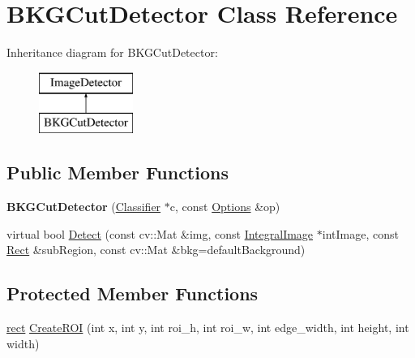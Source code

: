 \hypertarget{classBKGCutDetector}{}\section{B\+K\+G\+Cut\+Detector Class Reference}
\label{classBKGCutDetector}
Inheritance diagram for B\+K\+G\+Cut\+Detector\+:\begin{figure}[H]
\begin{center}
\leavevmode
\includegraphics[height=2.000000cm]{classBKGCutDetector}
\end{center}
\end{figure}
\subsection*{Public Member Functions}
\begin{DoxyCompactItemize}
\item 
\hypertarget{classBKGCutDetector_aa2daa11dc23936ccbb48ff3b356dfabb}{}{\bfseries B\+K\+G\+Cut\+Detector} (\hyperlink{classClassifier}{Classifier} $\ast$c, const \hyperlink{structOptions}{Options} \&op)\label{classBKGCutDetector_aa2daa11dc23936ccbb48ff3b356dfabb}

\item 
virtual bool \hyperlink{classBKGCutDetector_af20d7a8db9419da74cafdf977eed9c29}{Detect} (const cv\+::\+Mat \&img, const \hyperlink{classIntegralImage}{Integral\+Image} $\ast$int\+Image, const \hyperlink{classRect}{Rect} \&sub\+Region, const cv\+::\+Mat \&bkg=default\+Background)
\end{DoxyCompactItemize}
\subsection*{Protected Member Functions}
\begin{DoxyCompactItemize}
\item 
\hyperlink{structrect}{rect} \hyperlink{classBKGCutDetector_a2d0179ff253ad09c1549c8437e07736f}{Create\+R\+O\+I} (int x, int y, int roi\+\_\+h, int roi\+\_\+w, int edge\+\_\+width, int height, int width)
\end{DoxyCompactItemize}

